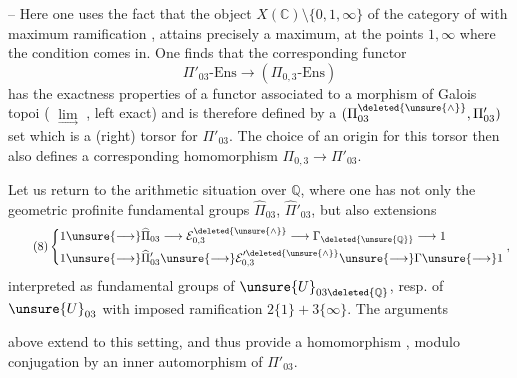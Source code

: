 
-- Here one uses the fact that the object $X(\mathbb C)\setminus\{0,1,\infty\}$ of the category of  with maximum ramification , attains precisely a maximum, at the points $1,\infty$ where the condition comes in.
One finds that the corresponding functor
\[
\tag{7 bis}
\Pi'_{03}\text{-}\mathrm{Ens}\longrightarrow(\Pi_{0,3}\text{-}\mathrm{Ens})
\]
has the exactness properties of a functor associated to a morphism of Galois topoi
( $\underset{\longrightarrow}{\lim}$ , left exact) and is therefore defined by a $(\Pi_{03}^{\deleted{\unsure{\wedge}}},\Pi'_{03})$ set which is a (right) torsor for $\Pi'_{03}$. The choice of an origin for this torsor then also defines a corresponding homomorphism $\Pi_{0,3}\longrightarrow\Pi'_{03}$.


Let us return to the arithmetic situation over $\mathbb Q$, where one has not only the geometric profinite fundamental groups $\widehat{\Pi}_{03}$, $\widehat{\Pi}'_{03}$, but also extensions
\[
\tag{8}
\left\{\begin{aligned}
1&\unsure{\longrightarrow}\widehat{\Pi}_{03}\longrightarrow\mathcal E_{0,3}^{\deleted{\unsure{\wedge}}}\longrightarrow\Gamma_{\deleted{\unsure{\mathbb Q}}}\longrightarrow1\\
1&\unsure{\longrightarrow}\widehat{\Pi}'_{03}\unsure{\longrightarrow}\mathcal E_{0,3}^{\prime\deleted{\unsure{\wedge}}}\unsure{\longrightarrow}\Gamma\unsure{\longrightarrow}1
\end{aligned}\right.,
\]
interpreted as fundamental groups of $\unsure{U}_{03\deleted{\mathbb Q}}$, resp. of $\unsure{U}_{03}$ with imposed ramification $2\{1\}+3\{\infty\}$. The arguments


above extend to this setting, and thus provide a homomorphism  
,
modulo conjugation by an inner automorphism of $\Pi'_{03}$.

